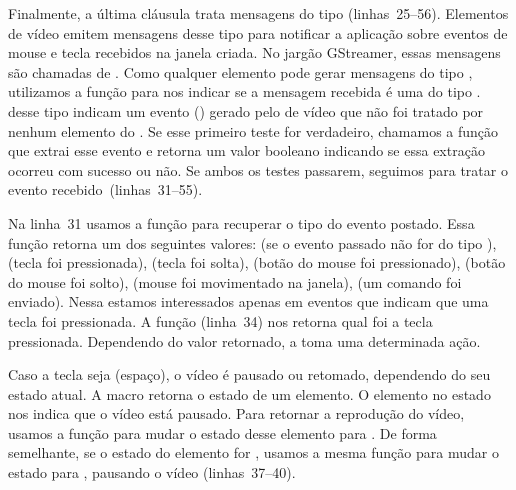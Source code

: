 Finalmente, a última cláusula  trata mensagens do tipo
 (linhas~25--56). Elementos  de vídeo emitem
mensagens desse tipo para notificar a aplicação sobre eventos de mouse e tecla
recebidos na janela criada. No jargão GStreamer, essas mensagens são chamadas
de . Como qualquer elemento pode gerar mensagens do
tipo , utilizamos a função
 para nos indicar se a mensagem recebida
é uma  do tipo . 
 desse tipo indicam um evento () gerado 
pelo  de vídeo que não foi tratado por nenhum elemento do
. Se esse primeiro teste for verdadeiro, chamamos a função
 que extrai esse evento e retorna 
um valor booleano indicando se essa extração ocorreu com sucesso ou não.
Se ambos os testes passarem, seguimos para tratar o evento
recebido~(linhas~31--55). 

Na linha~31 usamos a função  para recuperar
o tipo do evento postado. Essa função retorna um dos seguintes valores:
 (se o evento passado não for do tipo
),  (tecla foi pressionada),
 (tecla foi solta),  
 (botão do mouse foi pressionado),  
 (botão do mouse foi solto),  
 (mouse foi movimentado na janela),  
 (um comando foi enviado).  
Nessa  estamos interessados apenas em eventos que indicam que
uma tecla foi pressionada. A função 
(linha~34) nos retorna qual foi a tecla pressionada. Dependendo do valor
retornado, a  toma uma determinada ação.  

Caso a tecla seja  (espaço), o vídeo é pausado ou retomado,
dependendo do seu estado atual. A macro  retorna o estado de um
elemento. O elemento  no estado  nos indica que
o vídeo está pausado. Para retornar a reprodução do vídeo, usamos a função
 para mudar o estado desse elemento para
. De forma semelhante, se o estado do elemento 
for , usamos a mesma função para mudar o estado para
, pausando o vídeo (linhas~37--40).


